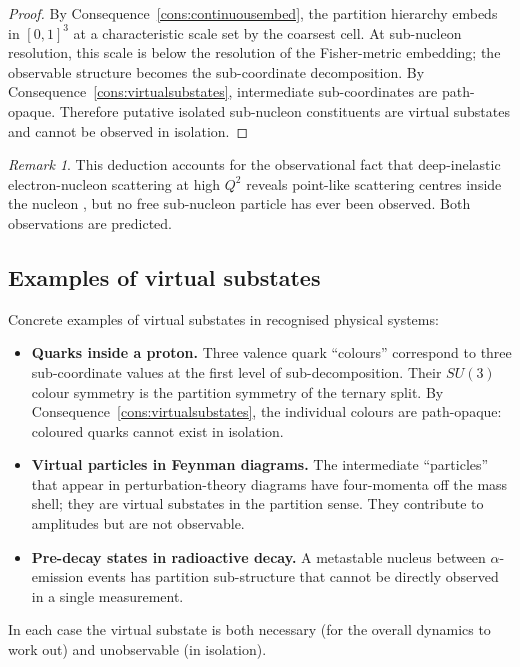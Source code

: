 \documentclass[11pt,twocolumn,a4paper]{article}
\theoremstyle{axiomstyle}
\theoremstyle{conseqstyle}
\theoremstyle{definition}
\theoremstyle{remark}
\newtheorem*{remark}{Remark}
\begin{document}
\begin{proof}
By Consequence~\ref{cons:continuousembed}, the partition hierarchy embeds in $[0,1]^{3}$ at a characteristic scale set by the coarsest cell. At sub-nucleon resolution, this scale is below the resolution of the Fisher-metric embedding; the observable structure becomes the sub-coordinate decomposition. By Consequence~\ref{cons:virtualsubstates}, intermediate sub-coordinates are path-opaque. Therefore putative isolated sub-nucleon constituents are virtual substates and cannot be observed in isolation.
\end{proof}

\begin{remark}
This deduction accounts for the observational fact that deep-inelastic electron-nucleon scattering at high $Q^{2}$ reveals point-like scattering centres inside the nucleon \citep{friedman1972}, but no free sub-nucleon particle has ever been observed. Both observations are predicted.
\end{remark}

\subsection{Examples of virtual substates}

Concrete examples of virtual substates in recognised physical systems:
\begin{itemize}
\item \textbf{Quarks inside a proton.} Three valence quark ``colours'' correspond to three sub-coordinate values at the first level of sub-decomposition. Their $SU(3)$ colour symmetry is the partition symmetry of the ternary split. By Consequence~\ref{cons:virtualsubstates}, the individual colours are path-opaque: coloured quarks cannot exist in isolation.
\item \textbf{Virtual particles in Feynman diagrams.} The intermediate ``particles'' that appear in perturbation-theory diagrams have four-momenta off the mass shell; they are virtual substates in the partition sense. They contribute to amplitudes but are not observable.
\item \textbf{Pre-decay states in radioactive decay.} A metastable nucleus between $\alpha$-emission events has partition sub-structure that cannot be directly observed in a single measurement.
\end{itemize}

In each case the virtual substate is both necessary (for the overall dynamics to work out) and unobservable (in isolation).
\end{document}

